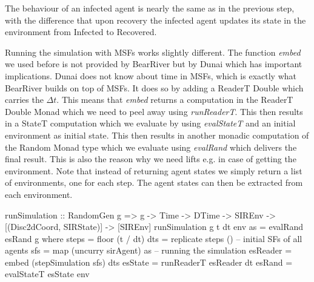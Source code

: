 The behaviour of an infected agent is nearly the same as in the previous step, with the difference that upon recovery the infected agent updates its state in the environment from Infected to Recovered.

Running the simulation with MSFs works slightly different. The function \textit{embed} we used before is not provided by BearRiver but by Dunai which has important implications. Dunai does not know about time in MSFs, which is exactly what BearRiver builds on top of MSFs. It does so by adding a ReaderT Double which carries the $\Delta t$. This means that \textit{embed} returns a computation in the ReaderT Double Monad which we need to peel away using \textit{runReaderT}. This then results in a StateT computation which we evaluate by using \textit{evalStateT} and an initial environment as initial state. This then results in another monadic computation of the Random Monad type which we evaluate using \textit{evalRand} which delivers the final result. This is also the reason why we need lifts e.g. in case of getting the environment. Note that instead of returning agent states we simply return a list of environments, one for each step. The agent states can then be extracted from each environment.

\begin{HaskellCode}
runSimulation :: RandomGen g => g -> Time -> DTime 
  -> SIREnv -> [(Disc2dCoord, SIRState)] -> [SIREnv]
runSimulation g t dt env as = evalRand esRand g
  where
    steps    = floor (t / dt)
    dts      = replicate steps ()
    -- initial SFs of all agents
    sfs      = map (uncurry sirAgent) as   
    -- running the simulation   
    esReader = embed (stepSimulation sfs) dts 
    esState  = runReaderT esReader dt 
    esRand   = evalStateT esState env     
\end{HaskellCode}


